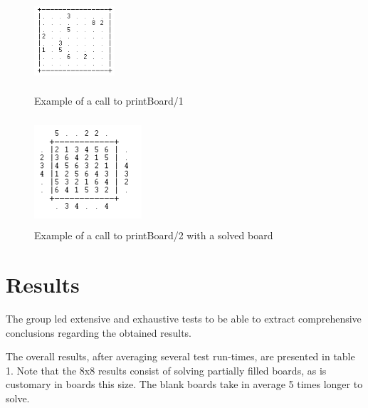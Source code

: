 \documentclass{llncs}
\begin{document}
\begin{figure}[h]
	\centering
\begin{minipage}{.35\textwidth}
	\centering
	\includegraphics[height=3cm,width=3cm]{images/printBoard1.png}
	\caption{Example of a call to printBoard/1}
	\label{Figure 3}
\end{minipage}
\quad \quad
\begin{minipage}{.35\textwidth}
	\centering
	\includegraphics[height=4cm,width=4cm]{images/printBoard21.png}
	\caption{Example of a call to printBoard/2 with a solved board}
	\label{Figure 4}
\end{minipage}
\end{figure}

%
\section{Results}

The group led extensive and exhaustive tests to be able to extract comprehensive conclusions regarding the obtained results.

The overall results, after averaging several test run-times, are presented in table 1.
Note that the 8x8 results consist of solving partially filled boards, as is customary in boards this size. The blank boards take in average 5 times longer to solve.
\end{document}
